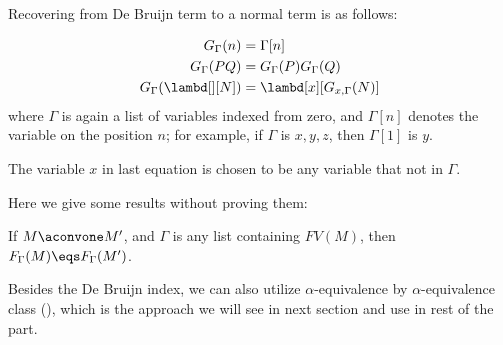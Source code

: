 \documentclass[../../../include/open-logic-section]{subfiles}
\begin{document}
Recovering from De Bruijn term to a normal term is as follows:
\begin{defn}
  \begin{align*}
    G_\Gamma(n) &= \Gamma[n] \\
    G_\Gamma(PQ) &= G_\Gamma(P) G_\Gamma(Q) \\
    G_\Gamma(\lambd[][N]) &= \lambd[x][G_{x,\Gamma}(N)]
  \end{align*}
  where $\Gamma$ is again a list of variables indexed from zero, and
  $\Gamma[n]$ denotes the variable on the position $n$; for example,
  if $\Gamma$ is $x,y,z$, then $\Gamma[1]$ is $y$.

  The variable $x$ in last equation is chosen to be any variable that
  not in $\Gamma$.
\end{defn}

Here we give some results without proving them:
\begin{prop}
  If $M \aconvone M'$, and $\Gamma$ is any list containing $FV(M)$, then
  $F_\Gamma(M) \eqs F_\Gamma(M')$.
\end{prop}

Besides the De Bruijn index, we can also utilize $\alpha$-equivalence
by $\alpha$-equivalence class (), which is
the approach we will see in next section and use in rest of the part.
\end{document}
